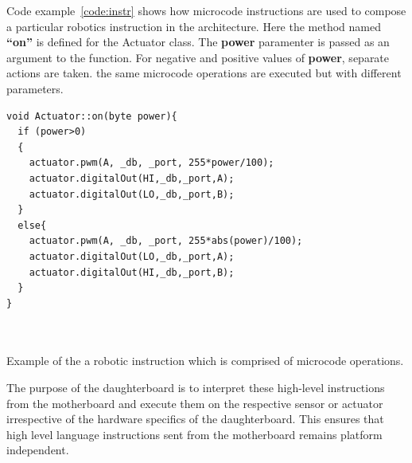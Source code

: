 	Code example~\ref{code:instr} shows how microcode instructions are used to compose a particular robotics instruction in the \xten architecture. Here the method named \textbf{``on''} is defined for the Actuator class. The \textbf{power} paramenter is passed as an argument to the function. For negative and positive values of \textbf{power}, separate actions are taken. the same microcode operations are executed but with different parameters.
	\begin{listing}[H]
		\footnotesize
		\label{code:instr}
		\begin{verbatim}
void Actuator::on(byte power){
  if (power>0)
  {
    actuator.pwm(A, _db, _port, 255*power/100);
    actuator.digitalOut(HI,_db,_port,A);
    actuator.digitalOut(LO,_db,_port,B);
  }
  else{
    actuator.pwm(A, _db, _port, 255*abs(power)/100);
    actuator.digitalOut(LO,_db,_port,A);
    actuator.digitalOut(HI,_db,_port,B);
  }
}
	
	
		\end{verbatim}
		\caption{Example of the a robotic instruction which is comprised of microcode operations.} 
	\end{listing}
	
	
	The purpose of the daughterboard is to interpret these high-level instructions from the motherboard and execute them on the respective sensor or actuator irrespective of the hardware specifics of the daughterboard. This ensures that high level language instructions sent from the motherboard remains platform independent.
	
	
	
